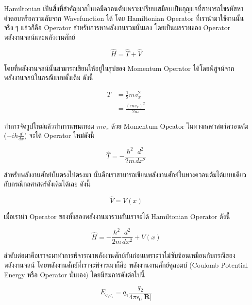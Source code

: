 Hamiltonian เป็นสิ่งที่สำคัญมากในเคมีควอนตัมเพราะเปรียบเสมือนเป็นกุญแจที่สามารถไขรหัสหาคำตอบหรือความลับจาก Wavefunction ได้
โดย Hamiltonian Operator ที่เรานำมาใช้งานนั้นจริง ๆ แล้วก็คือ Operator สำหรับการหาพลังงานรวมนั่นเอง โดยเป็นผลรวมของ Operator 
พลังงานจลน์และพลังงานศักย์

\begin{equation}\label{eq:hamiltonian}
    \hat{H} = \hat{T} + \hat{V}
\end{equation}

\noindent โดยที่พลังงานจลน์นั้นสามารถเขียนให้อยู่ในรูปของ Momentum Operator ได้โดยพิสูจน์จากพลังงานจลน์ในกรณีแบบดั้งเดิม ดังนี้

\begin{align}
    T &= \frac{1}{2}mv^{2}_{x} \\
      &= \frac{(mv_{x})^{2}}{2m}
\end{align}

\noindent ทำการจัดรูปใหม่แล้วทำการแทนเทอม $mv_{x}$ ด้วย Momentum Opeator ในทางกลศาสตร์ควอนตัม ($-ih\frac{d}{dx}$) 
จะได้ Operator ใหม่ดังนี้

\begin{equation}
    \hat{T} = -\frac{\hbar^{2}}{2m}\frac{d^{2}}{dx^{2}}
\end{equation}

สำหรับพลังงานศักย์นั้นตรงไปตรงมา นั่นคือเราสามารถเขียนพลังงานศักย์ในทางควอนตัมได้แบบเดียวกับกรณีกลศาสตร์ดั้งเดิมได้เลย ดังนี้

\begin{equation}
    \hat{V} = V(x)
\end{equation}

เมื่อเรานำ Operator ของทั้งสองพลังงานมารวมกันเราจะได้ Hamiltonian Operator ดังนี้

\begin{equation}
    \hat{H} = -\frac{\hbar^{2}}{2m}\frac{d^{2}}{dx^{2}} + V(x)
\end{equation}

ลำดับต่อมาคือเราจะมาทำการพิจารณาพลังงานศักย์กันก่อนเพราะว่าไม่ซับซ้อนเหมือนกับกรณีของพลังงานจลน์ โดยพลังงานศักย์ที่เราจะพิจารณาก็คือ%
พลังงานงานศักย์คูลอมบ์ (Coulomb Potential Energy หรือ Operator นั่นเอง) โดยมีสมการดังต่อไปนี้

\begin{equation}
    E_{q_{1}q_{2}} = q_{1}\frac{q_{2}}{4\pi\epsilon_{0}|\bm{R}|}
\end{equation}

